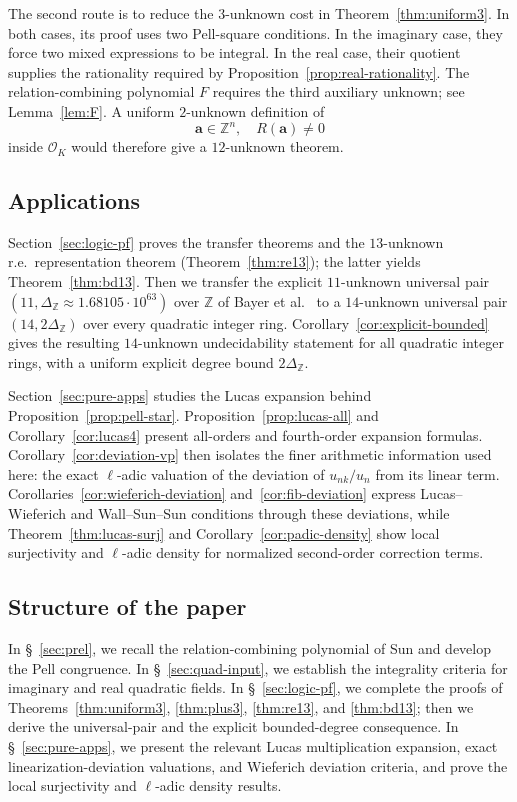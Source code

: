 \documentclass[12pt]{amsart}
\numberwithin{equation}{section}
\theoremstyle{remark}
\theoremstyle{plain}
\newcommand{\Z}{\mathbb{Z}}
\newcommand{\sO}{\mathcal{O}}
\newcommand{\ba}{\mathbf{a}}
\begin{document}
The second route is to reduce the $3$-unknown cost in Theorem~\ref{thm:uniform3}. In both cases, its proof uses two Pell-square conditions. In the imaginary case, they force two mixed expressions to be integral. In the real case, their quotient supplies the rationality required by Proposition~\ref{prop:real-rationality}. The relation-combining polynomial $F$ requires the third auxiliary unknown; see Lemma~\ref{lem:F}. A uniform $2$-unknown definition of
\[
\ba\in\Z^n,\quad R(\ba)\neq0
\]
inside $\sO_K$ would therefore give a $12$-unknown theorem.

\subsection{Applications}
Section~\ref{sec:logic-pf} proves the transfer theorems and the $13$-unknown r.e.\ representation theorem (Theorem~\ref{thm:re13}); the latter yields Theorem~\ref{thm:bd13}. Then we transfer the explicit $11$-unknown universal pair $(11,\Delta_{\Z}\approx1.68105\cdot10^{63})$ over $\Z$ of Bayer et al.\ \cite{BayerEtAl25,BayerDavid25} to a $14$-unknown universal pair $(14,2\Delta_{\Z})$ over every quadratic integer ring. Corollary~\ref{cor:explicit-bounded} gives the resulting $14$-unknown undecidability statement for all quadratic integer rings, with a uniform explicit degree bound $2\Delta_{\Z}$.

Section~\ref{sec:pure-apps} studies the Lucas expansion behind Proposition~\ref{prop:pell-star}. Proposition~\ref{prop:lucas-all} and Corollary~\ref{cor:lucas4} present all-orders and fourth-order expansion formulas. Corollary~\ref{cor:deviation-vp} then isolates the finer arithmetic information used here: the exact $\ell$-adic valuation of the deviation of $u_{nk}/u_n$ from its linear term. Corollaries~\ref{cor:wieferich-deviation} and~\ref{cor:fib-deviation} express Lucas--Wieferich and Wall--Sun--Sun conditions through these deviations, while Theorem~\ref{thm:lucas-surj} and Corollary~\ref{cor:padic-density} show local surjectivity and $\ell$-adic density for normalized second-order correction terms.

\subsection*{Structure of the paper}
In \S~\ref{sec:prel}, we recall the relation-combining polynomial of Sun and develop the Pell congruence. In \S~\ref{sec:quad-input}, we establish the integrality criteria for imaginary and real quadratic fields. In \S~\ref{sec:logic-pf}, we complete the proofs of Theorems~\ref{thm:uniform3}, \ref{thm:plus3}, \ref{thm:re13}, and \ref{thm:bd13}; then we derive the universal-pair and the explicit bounded-degree consequence. In \S~\ref{sec:pure-apps}, we present the relevant Lucas multiplication expansion, exact linearization-deviation valuations, and Wieferich deviation criteria, and prove the local surjectivity and $\ell$-adic density results.
\end{document}
